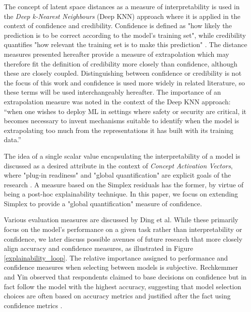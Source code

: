 \documentclass{article}
\begin{document}
The concept of latent space distances as a measure of interpretability is used in the \textit{Deep k-Nearest Neighbours} (Deep KNN) approach \cite{papernot_deep_2018} where it is applied in the context of confidence and credibility. Confidence is defined as "how likely the prediction is to be correct according to the model’s training set", while credibility quantifies "how relevant the training set is to make this prediction" \cite[p.7]{papernot_deep_2018}. The distance measures presented hereafter provide a measure of extrapolation which may therefore fit the definition of credibility more closely than confidence, although these are closely coupled. Distinguishing between confidence or credibility is not the focus of this work and confidence is used more widely in related literature, so these terms will be used interchangeably hereafter. The importance of an extrapolation measure was noted in the context of the Deep KNN approach: “when one wishes to deploy ML in settings where safety or security are critical, it becomes necessary to invent mechanisms suitable to identify when the model is extrapolating too much from the representations it has built with its training data.”\cite[p.5]{papernot_deep_2018}

The idea of a single scalar value encapsulating the interpretability of a model is discussed as a desired attribute in the context of \textit{Concept Activation Vectors}, where "plug-in readiness" and "global quantification" are explicit goals of the research \cite[p.2]{kim_interpretability_2018}. A measure based on the Simplex residuals has the former, by virtue of being a post-hoc explainability technique. In this paper, we focus on extending Simplex to provide a "global quantification" measure of confidence.

Various evaluation measures are discussed by Ding et al. \cite{ding_model_2018} While these primarily focus on the model's performance on a given task rather than interpretability or confidence, we later discuss possible avenues of future research that more closely align accuracy and confidence measures, as illustrated in Figure \ref{explainability_loop}.
The relative importance assigned to performance and confidence measures when selecting between models is subjective. Rechkemmer and Yin observed that respondents claimed to base decisions on confidence but in fact follow the model with the highest accuracy, suggesting that model selection choices are often based on accuracy metrics and justified after the fact using confidence metrics \cite{rechkemmer_when_2022}.
\end{document}
